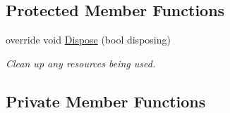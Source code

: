 \subsection*{Protected Member Functions}
\begin{DoxyCompactItemize}
\item 
override void \hyperlink{class_price_comparison_form_1_1_form_price_compare_ac6e7f09c0ae60d51df76b56f110c8934}{Dispose} (bool disposing)
\begin{DoxyCompactList}\small\item\em Clean up any resources being used. \end{DoxyCompactList}\end{DoxyCompactItemize}
\subsection*{Private Member Functions}
